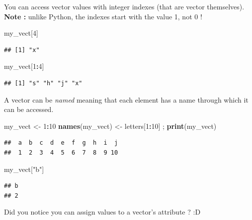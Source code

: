 \documentclass[
]{book}
\newenvironment{Shaded}{\begin{snugshade}}{\end{snugshade}}
\newcommand{\DecValTok}[1]{\textcolor[rgb]{0.00,0.00,0.81}{#1}}
\newcommand{\KeywordTok}[1]{\textcolor[rgb]{0.13,0.29,0.53}{\textbf{#1}}}
\newcommand{\NormalTok}[1]{#1}
\newcommand{\OperatorTok}[1]{\textcolor[rgb]{0.81,0.36,0.00}{\textbf{#1}}}
\newcommand{\StringTok}[1]{\textcolor[rgb]{0.31,0.60,0.02}{#1}}
\begin{document}
You can access vector values with integer indexes (that are vector themselves). \textbf{Note :} unlike Python, the indexes start with the value 1, not 0 !

\begin{Shaded}
\begin{Highlighting}[]
\NormalTok{my_vect[}\DecValTok{4}\NormalTok{]}
\end{Highlighting}
\end{Shaded}

\begin{verbatim}
## [1] "x"
\end{verbatim}

\begin{Shaded}
\begin{Highlighting}[]
\NormalTok{my_vect[}\DecValTok{1}\OperatorTok{:}\DecValTok{4}\NormalTok{]}
\end{Highlighting}
\end{Shaded}

\begin{verbatim}
## [1] "s" "h" "j" "x"
\end{verbatim}

A vector can be \emph{named} meaning that each element has a name through which it can be accessed.

\begin{Shaded}
\begin{Highlighting}[]
\NormalTok{my_vect <-}\StringTok{ }\DecValTok{1}\OperatorTok{:}\DecValTok{10}
\KeywordTok{names}\NormalTok{(my_vect) <-}\StringTok{ }\NormalTok{letters[}\DecValTok{1}\OperatorTok{:}\DecValTok{10}\NormalTok{] ; }\KeywordTok{print}\NormalTok{(my_vect)}
\end{Highlighting}
\end{Shaded}

\begin{verbatim}
##  a  b  c  d  e  f  g  h  i  j 
##  1  2  3  4  5  6  7  8  9 10
\end{verbatim}

\begin{Shaded}
\begin{Highlighting}[]
\NormalTok{my_vect[}\StringTok{"b"}\NormalTok{]}
\end{Highlighting}
\end{Shaded}

\begin{verbatim}
## b 
## 2
\end{verbatim}

Did you notice you can assign values to a vector's attribute ? :D
\end{document}
